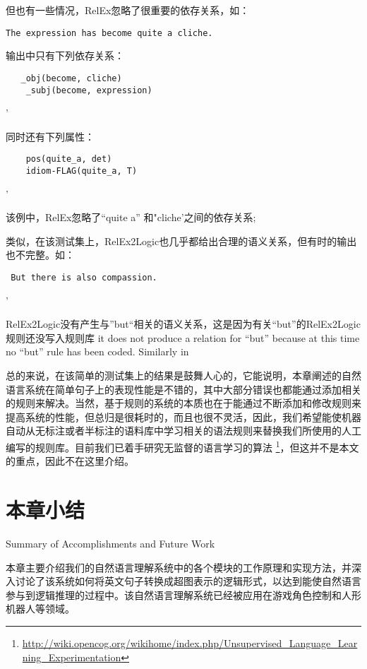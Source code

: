 \noindent  但也有一些情况，RelEx忽略了很重要的依存关系，如：

 \begin{verbatim}
The expression has become quite a cliche.
\end{verbatim}

输出中只有下列依存关系：

 \begin{verbatim}
   _obj(become, cliche)
    _subj(become, expression)
   \end{verbatim}'
     
同时还有下列属性：

 \begin{verbatim}
    pos(quite_a, det)
    idiom-FLAG(quite_a, T)
   \end{verbatim}'
     
\noindent 该例中，RelEx忽略了``quite a'' 和"cliche'之间的依存关系;

 类似，在该测试集上，RelEx2Logic也几乎都给出合理的语义关系，但有时的输出也不完整。如：

  \begin{verbatim}
 But there is also compassion. 
    \end{verbatim}'
 
 \noindent RelEx2Logic没有产生与”but“相关的语义关系，这是因为有关“but”的RelEx2Logic规则还没写入规则库
it does not produce a relation for ``but'' because at this time no ``but'' rule has been coded.   Similarly in
 
总的来说，在该简单的测试集上的结果是鼓舞人心的，它能说明，本章阐述的自然语言系统在简单句子上的表现性能是不错的，其中大部分错误也都能通过添加相关的规则来解决。当然，基于规则的系统的本质也在于能通过不断添加和修改规则来提高系统的性能，但总归是很耗时的，而且也很不灵活，因此，我们希望能使机器自动从无标注或者半标注的语料库中学习相关的语法规则来替换我们所使用的人工编写的规则库。目前我们已着手研究无监督的语言学习的算法 \footnote {\url{http://wiki.opencog.org/wikihome/index.php/Unsupervised_Language_Learning_Experimentation}}，但这并不是本文的重点，因此不在这里介绍。

\section{本章小结}{Summary of Accomplishments and Future Work}

本章主要介绍我们的自然语言理解系统中的各个模块的工作原理和实现方法，并深入讨论了该系统如何将英文句子转换成超图表示的逻辑形式，以达到能使自然语言参与到逻辑推理的过程中。该自然语言理解系统已经被应用在游戏角色控制和人形机器人等领域。

